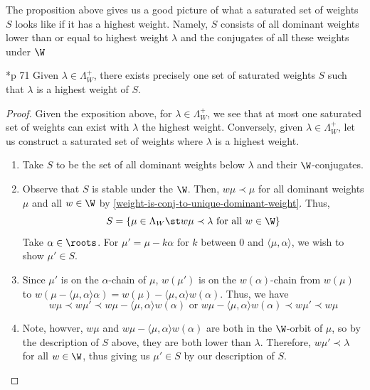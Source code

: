 \documentclass[11pt,leqno,oneside]{amsart}
\numberwithin{thm}{section}
\newcommand{\weightlattice}{\Lambda_W}
\begin{document}
The proposition above gives us a good picture of what a saturated set
of weights \(S\) looks like if it has a highest weight. Namely, \(S\)
consists of all dominant weights lower than or equal to highest weight
\(\lambda\) and the conjugates of all these weights under \(\W\)
\begin{cor}
  \cite{humph}*{p 71} Given \(\lambda \in \weightlattice^+\), there exists precisely one
  set of saturated weights \(S\) such that \(\lambda\) is a highest
  weight of \(S\).
\end{cor}
\begin{proof}
  Given the exposition above, for \(\lambda \in \weightlattice^+\), we
  see that at most one saturated set of weights can exist with
  \(\lambda\) the highest weight. Conversely, given \(\lambda \in
  \weightlattice^+\), let us construct a saturated set of weights where
  \(\lambda\) is a highest weight.
  \begin{enumerate}
  \item Take \(S\) to be the set of all dominant weights below
    \(\lambda\) and their \(\W\)-conjugates.
  \item Observe that \(S\) is stable under the \(\W\). Then, \(w \mu
    \prec \mu\) for all dominant weights \(\mu\) and all \(w \in
    \W\) by \ref{weight-is-conj-to-unique-dominant-weight}. Thus, \[
      S = \{\mu \in \weightlattice \st w \mu \prec \lambda \text{ for
        all } w \in \W\}
    \]
    Take \(\alpha \in \roots\). For \(\mu' = \mu - k \alpha\) for
    \(k\) between \(0\) and 
    \(\langle \mu, \alpha \rangle\), we wish to show \(\mu' \in S\).
  \item Since \(\mu'\) is on the \(\alpha\)-chain of \(\mu\),
    \(w(\mu')\) is on the \(w(\alpha)\)-chain from \(w(\mu)\) to
    \(w(\mu-\langle \mu,\alpha \rangle \alpha) = w(\mu)-\langle
    \mu,\alpha \rangle w(\alpha)\). Thus, we have \[
      w \mu \prec w \mu' \prec w \mu - \langle \mu,\alpha \rangle w
      (\alpha) \text{ or } w \mu - \langle \mu,\alpha \rangle w
      (\alpha) \prec w \mu' \prec w\mu
    \]
  \item Note, howver, \(w\mu\) and \(w \mu - \langle \mu,\alpha \rangle w
      (\alpha)\) are both in the \(\W\)-orbit of \(\mu\), so by the
      description of \(S\) above, they are both lower than
      \(\lambda\). Therefore, \(w \mu' \prec \lambda\) for all \(w \in
      \W\), thus giving us \(\mu' \in S\) by our description of \(S\).
  \end{enumerate}

\end{proof}
\end{document}
